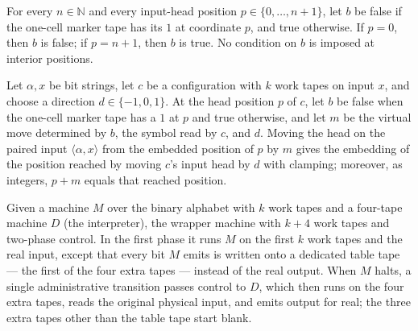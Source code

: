 \begin{lemma}
\label{Turing.universalInput_tag}
\leanok
{}
For every $n\in\mathbb{N}$ and every input-head position $p\in\{0,\ldots,n+1\}$, let $b$
be false if the one-cell marker tape has its $1$ at coordinate $p$, and true otherwise.
If $p=0$, then $b$ is false; if $p=n+1$, then $b$ is true. No condition on $b$ is
imposed at interior positions.
\end{lemma}

\begin{lemma}
\label{Turing.universalInput_move}
\leanok
{}
Let $\alpha,x$ be bit strings, let $c$ be a configuration with $k$ work tapes on input
$x$, and choose a direction $d\in\{-1,0,1\}$. At the head position $p$ of $c$, let $b$
be false when the one-cell marker tape has a $1$ at $p$ and true otherwise, and let $m$
be the virtual move determined by $b$, the symbol read by $c$, and $d$. Moving the head
on the paired input $\langle\alpha,x\rangle$ from the embedded position of $p$ by $m$
gives the embedding of the position reached by moving $c$'s input head by $d$ with
clamping; moreover, as integers, $p+m$ equals that reached position.
\end{lemma}

\begin{definition}
\label{Turing.universalCaptureTM}
\leanok
{}
Given a machine $M$ over the binary alphabet with $k$ work tapes and a
four-tape machine $D$ (the interpreter), the wrapper machine with $k+4$ work
tapes and two-phase control.  In the first phase it runs $M$ on the first $k$
work tapes and the real input, except that every bit $M$ emits is written
onto a dedicated table tape --- the first of the four extra tapes --- instead
of the real output.  When $M$ halts, a single administrative transition
passes control to $D$, which then runs on the four extra tapes, reads the
original physical input, and emits output for real; the three extra tapes
other than the table tape start blank.
\end{definition}

